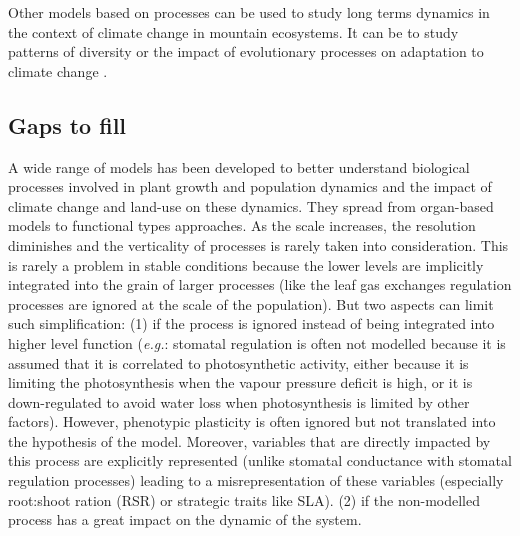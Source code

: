 Other models based on processes can be used to study long terms dynamics in the context of climate change in mountain ecosystems. It can be to study patterns of diversity \parencite{isabelle_fate-hd_2014} or the impact of evolutionary processes on adaptation to climate change \parencite{cotto_dynamic_2017}.






\subsection{Gaps to fill}

A wide range of models has been developed to better understand biological processes involved in plant growth and population dynamics and the impact of climate change and land-use on these dynamics. They spread from organ-based models to functional types approaches. As the scale increases, the resolution diminishes and the verticality of processes is rarely taken into consideration. This is rarely a problem in stable conditions because the lower levels are implicitly integrated into the grain of larger processes (like the leaf gas exchanges regulation processes are ignored at the scale of the population). But two aspects can limit such simplification: (1) if the process is ignored instead of being integrated into higher level function (\textit{e.g.}: stomatal regulation is often not modelled because it is assumed that it is correlated to photosynthetic activity, either because it is limiting the photosynthesis when the vapour pressure deficit is high, or it is down-regulated to avoid water loss when photosynthesis is limited by other factors). However, phenotypic plasticity is often ignored but not translated into the hypothesis of the model. Moreover, variables that are directly impacted by this process are explicitly represented (unlike stomatal conductance with stomatal regulation processes) leading to a misrepresentation of these variables (especially root:shoot ration (RSR) or strategic traits like SLA). (2) if the non-modelled process has a great impact on the dynamic of the system. 

